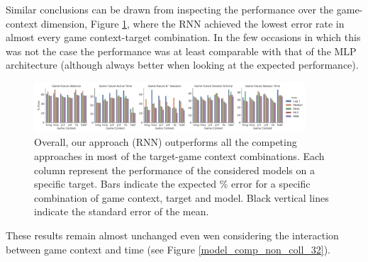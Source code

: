 Similar conclusions can be drawn from inspecting the performance over the game-context dimension, Figure \ref{model_comp_coll_time_32}, where the RNN achieved the lowest error rate in almost every game context-target combination. In the few occasions in which this was not the case the performance was at least comparable with that of the MLP architecture (although always better when looking at the expected performance).

\begin{figure}[h]
\centering
\includegraphics[width=0.9\textwidth]{images/chapter_3/models_comparison_collapsed_time_32.png}
\caption[\textbf{Model comparison collapsing over time}]{ Overall, our approach (RNN) outperforms all the competing approaches in most of the target-game context combinations. Each column represent the performance of the considered models on a specific target. Bars indicate the expected \% error for a specific combination of game context, target and model. Black vertical lines indicate the standard error of the mean.}
\label{model_comp_coll_time_32} 
\end{figure}

These results remain almost unchanged even wen considering the interaction between game context and time (see Figure \ref{model_comp_non_coll_32}).

